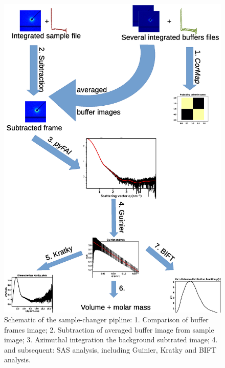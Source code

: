 \documentclass[preprint]{iucr}              %
\begin{document}
\begin{figure}
   \label{samplechanger_worflow}
   \includegraphics[width=12cm]{pipeline_subtract.eps}
   \caption{Schematic of the sample-changer pipline: 
   1. Comparison of buffer frames image;
   2. Subtraction of averaged buffer image from sample image;
   3. Azimuthal integration the background subtrated image;
   4. and subsequent: SAS analysis, including Guinier, Kratky and BIFT analysis.}
\end{figure}
\end{document}
